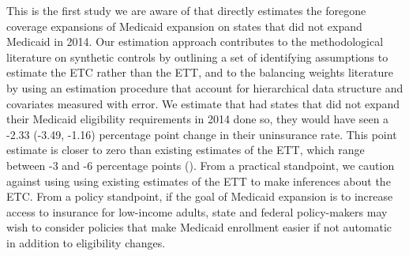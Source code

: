 This is the first study we are aware of that directly estimates the foregone coverage expansions of Medicaid expansion on states that did not expand Medicaid in 2014. Our estimation approach contributes to the methodological literature on synthetic controls by outlining a set of identifying assumptions to estimate the ETC rather than the ETT, and to the balancing weights literature by using an estimation procedure that account for hierarchical data structure and covariates measured with error. We estimate that had states that did not expand their Medicaid eligibility requirements in 2014 done so, they would have seen a -2.33 (-3.49, -1.16) percentage point change in their uninsurance rate. This point estimate is closer to zero than existing estimates of the ETT, which range between -3 and -6 percentage points (\cite{frean2017premium}). From a practical standpoint, we caution against using using existing estimates of the ETT to make inferences about the ETC. From a policy standpoint, if the goal of Medicaid expansion is to increase access to insurance for low-income adults, state and federal policy-makers may wish to consider policies that make Medicaid enrollment easier if not automatic in addition to eligibility changes.